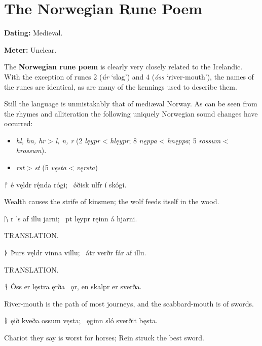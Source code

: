 \section{The Norwegian Rune Poem}\chapterStart{}

\begin{flushright}%
\textbf{Dating:} Medieval.%

\textbf{Meter:} Unclear.
\end{flushright}%

The \textbf{Norwegian rune poem} is clearly very closely related to the Icelandic.  With the exception of runes 2 (\emph{úr} ‘slag’) and 4 (\emph{óss} ‘river-mouth’), the names of the runes are identical, as are many of the kennings used to describe them.

Still the language is unmistakably that of mediæval Norway.  As can be seen from the rhymes and alliteration the following uniquely Norwegian sound changes have occurred:
\begin{itemize}
  \item \emph{hl, hn, hr} > \emph{l, n, r} (2 \emph{lęypr} < \emph{hlęypr}; 8 \emph{nęppa} < \emph{hnęppa}; 5 \emph{rossum} < \emph{hrossum}).
  \item \emph{rst} > \emph{st} (5 \emph{vęsta} < \emph{vęrsta})
\end{itemize}

\sectionline

\bvg\bva ᚠ é vęldr rę́nda rógi; \hld\ ǿðisk ulfr í skógi.\eva

\bvb Wealth causes the strife of kinsmen; the wolf feeds itself in the wood.\evb\evg


\bvg\bva ᚢ r ’s af illu jarni; \hld\ pt lęypr ręinn á hjarni.\eva

\bvb TRANSLATION.\evb\evg


\bvg\bva ᚦ Þurs vęldr vinna villu; \hld\ átr verðr fár af illu.\eva

\bvb TRANSLATION.\evb\evg


\bvg\bva ᚬ Óss er lęstra ęrða \hld\ ǫr, en skalpr er sverða.\eva

\bvb River-mouth is the path of most journeys, and the scabbard-mouth is of swords.\evb\evg


\bvg\bva ᚱ ęið kveða ossum vęsta; \hld\ ęginn sló sverðit bęsta.\eva

\bvb Chariot they say is worst for horses; Rein struck the best sword.\evb\evg


